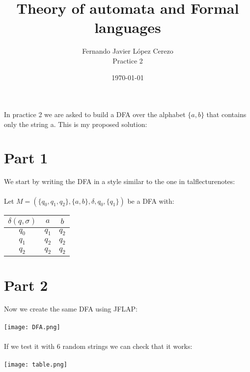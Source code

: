 \documentclass{article}
\title{Theory of automata and Formal languages}
\author{Fernando Javier López Cerezo \\ Practice 2}
\date{\today}
\begin{document}
\maketitle

In practice 2 we are asked to build a DFA over the alphabet $\{a,b\}$ that contains only the string a. This is my proposed solution:
\section*{Part 1}
We start by writing the DFA in a style similar to the one in talflecturenotes: \\\\ Let $M=(\{q_0,q_1,q_2\}, \{a,b\}, \delta, q_0, \{q_1\})$ be a DFA with:\\

\begin{table}[h!]
\begin{tabular}{c|c|c}
  $\delta(q,\sigma)$ & $a$ & $b$\\
  \hline
  $q_0$& $q_1$ & $q_2$\\
  \hline
  $q_1$& $q_2$ & $q_2$\\
  \hline
  $q_2$& $q_2$ & $q_2$
\end{tabular}
\end{table}

\begin{center}
\end{center}
\newpage
\section*{Part 2}
Now we create the same DFA using JFLAP: \\\\
\texttt{[image: DFA.png]} \\\\ If we test it with 6 random strings we can check that it works: \\\\ \texttt{[image: table.png]}
\newpage
\end{document}
